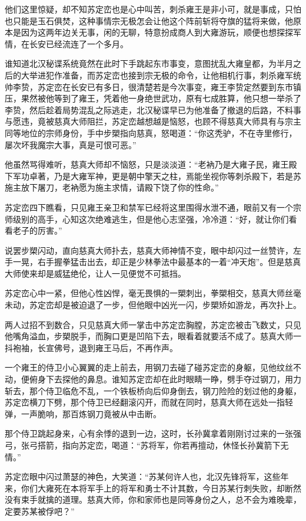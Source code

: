 他们这里惊疑，却不知苏定峦也是心中叫苦，刺杀雍王是非小可，就是事成，只怕也只能是玉石俱焚，这种事情宗无极怎会让他这个阵前斩将夺旗的猛将来做，他原本是因为这两年边关无事，闲的无聊，特意扮成商人到大雍游玩，顺便也想探探军情，在长安已经流连了一个多月。

谁知道北汉秘谍系统竟然在此时下手跳起东市事变，意图扰乱大雍皇都，为半月之后的大举进犯作准备，而苏定峦也接到宗无极的命令，让他相机行事，刺杀雍军统帅李贽，苏定峦在长安已有多日，很清楚若是今次事变，雍王李贽定然要到东市镇压，果然被他等到了雍王，凭着他一身绝世武功，原有七成胜算，他只想一举杀了李贽，然后趁着局势混乱之际逃走，北汉秘谍早已为他准备了撤退的后路，不料事与愿违，竟被慈真大师阻拦，苏定峦越想越是恼怒，也顾不得慈真大师具有与宗主同等地位的宗师身份，手中步槊指向慈真，怒喝道：“你这秃驴，不在寺里修行，屡次坏我魔宗大事，真是可恨可恶。”

他虽然骂得难听，慈真大师却不恼怒，只是淡淡道：“老衲乃是大雍子民，雍王殿下军功卓著，乃是大雍军神，更是朝中擎天之柱，焉能坐视你等刺杀殿下，若是苏施主放下屠刀，老衲愿为施主求情，请殿下饶了你的性命。”

苏定峦四下瞧看，只见雍王亲卫和禁军已经将这里围得水泄不通，眼前又有一个宗师级别的高手，心知这次绝难逃生，但是他心志坚强，冷冷道：“好，就让你们看看老子的厉害。”

说罢步槊闪动，直向慈真大师扑去，慈真大师神情不变，眼中却闪过一丝赞许，左手一晃，右手握拳猛击出去，却正是少林拳法中最基本的一着“冲天炮”。但是慈真大师使来却是威猛绝伦，让人一见便觉不可抵挡。

苏定峦心中一紧，但他心性凶悍，毫无畏惧的一槊刺出，拳槊相交，慈真大师丝毫未动，苏定峦却是被迫退了一步，但他眼中凶光一闪，步槊矫如游龙，再次扑上。

两人过招不到数合，只见慈真大师一掌击中苏定峦胸膛，苏定峦被击飞数丈，只见他嘴角溢血，步槊脱手，而胸口更是凹陷下去，眼看着就要活不成了。慈真大师一抖袍袖，长宣佛号，退到雍王马后，不再作声。

一个雍王的侍卫小心翼翼的走上前去，用钢刀去碰了碰苏定峦的身躯，见他纹丝不动，便俯身下去探他的鼻息。谁知苏定峦却在此时眼睛一睁，劈手夺过钢刀，用力斩去，那个侍卫临危不乱，一个铁板桥向后仰身倒去，钢刀险险的划过他的身躯，苏定峦横刀下劈，那个侍卫已经翻滚闪开，而就在同时，慈真大师在远处一指轻弹，一声脆响，那百炼钢刀竟被从中击断。

那个侍卫跳起身来，心有余悸的退到一边，这时，长孙冀拿着刚刚讨过来的一张强弓，张弓搭箭，指向苏定峦，喝道：“苏将军，你若再擅动，休怪长孙冀箭下无情。”

苏定峦眼中闪过萧瑟的神色，大笑道：“苏某何许人也，北汉先锋将军，这些年来，你们大雍死在本将军手上的将军和勇士不计其数，今日苏某行刺失败，却断然没有束手就擒的道理。慈真大师，你和家师也是同等身份之人，总不会为难晚辈，定要苏某被俘吧？”

